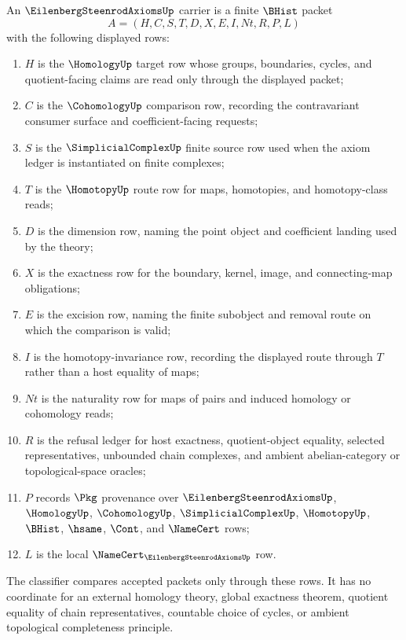 \begin{definition}
\label{def:eilenberg-steenrod-axioms-carrier}
An $\EilenbergSteenrodAxiomsUp$ carrier is a finite $\BHist$ packet
$$
A=(H,C,S,T,D,X,E,I,Nt,R,P,L)
$$
with the following displayed rows:
\begin{enumerate}
\item $H$ is the $\HomologyUp$ target row whose groups, boundaries, cycles, and quotient-facing claims are read only through the displayed packet;
\item $C$ is the $\CohomologyUp$ comparison row, recording the contravariant consumer surface and coefficient-facing requests;
\item $S$ is the $\SimplicialComplexUp$ finite source row used when the axiom ledger is instantiated on finite complexes;
\item $T$ is the $\HomotopyUp$ route row for maps, homotopies, and homotopy-class reads;
\item $D$ is the dimension row, naming the point object and coefficient landing used by the theory;
\item $X$ is the exactness row for the boundary, kernel, image, and connecting-map obligations;
\item $E$ is the excision row, naming the finite subobject and removal route on which the comparison is valid;
\item $I$ is the homotopy-invariance row, recording the displayed route through $T$ rather than a host equality of maps;
\item $Nt$ is the naturality row for maps of pairs and induced homology or cohomology reads;
\item $R$ is the refusal ledger for host exactness, quotient-object equality, selected representatives, unbounded chain complexes, and ambient abelian-category or topological-space oracles;
\item $P$ records $\Pkg$ provenance over $\EilenbergSteenrodAxiomsUp$, $\HomologyUp$, $\CohomologyUp$, $\SimplicialComplexUp$, $\HomotopyUp$, $\BHist$, $\hsame$, $\Cont$, and $\NameCert$ rows;
\item $L$ is the local $\NameCert_{\EilenbergSteenrodAxiomsUp}$ row.
\end{enumerate}
The classifier compares accepted packets only through these rows. It has no coordinate for an external homology theory, global exactness theorem, quotient equality of chain representatives, countable choice of cycles, or ambient topological completeness principle.
\end{definition}

